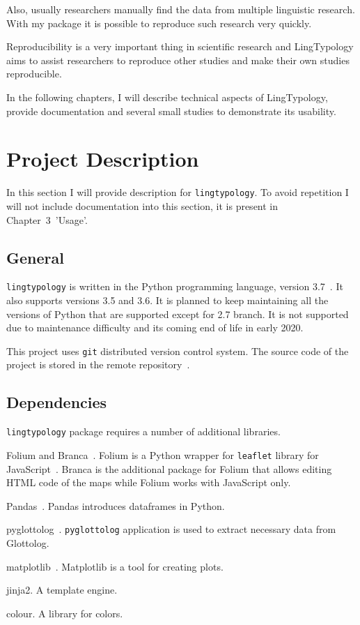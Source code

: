 \documentclass[a4paper,12pt]{article}
\begin{document}
Also, usually researchers manually find the data from multiple linguistic research. With my package it is possible to reproduce such research very quickly.

Reproducibility is a very important thing in scientific research and LingTypology aims to assist researchers to reproduce other studies and make their own studies reproducible.

In the following chapters, I will describe technical aspects of LingTypology, provide documentation and several small studies to demonstrate its usability.

\newpage


\section{Project Description}
In this section I will provide description for \texttt{lingtypology}. To avoid repetition I will not include documentation into this section, it is present in Chapter~3~'Usage'.

\subsection{General}
\texttt{lingtypology} is written in the Python programming language, version 3.7~\parencite{python}. It also supports versions 3.5 and 3.6. It is planned to keep maintaining all the versions of Python that are supported except for 2.7 branch. It is not supported due to maintenance difficulty and its coming end of life in early 2020.

This project uses \texttt{git} distributed version control system. The source code of the project is stored in the remote repository~\parencite{MichaelVoronov2019}.

\subsection{Dependencies}
\texttt{lingtypology} package requires a number of additional libraries.
\begin{itemize}
\begin{samepage}
  \item Folium and Branca~\parencite{folium}. Folium is a Python wrapper for \texttt{leaflet} library for JavaScript~\parencite{leaflet}. Branca is the additional package for Folium that allows editing HTML code of the maps while Folium works with JavaScript only. 
  \item Pandas~\parencite{pandas}. Pandas introduces dataframes in Python.
  \item pyglottolog~\parencite{Robert2Forkel2019}. \texttt{pyglottolog} application is used to extract necessary data from Glottolog.
  \item matplotlib~\parencite{matplotlib}. Matplotlib is a tool for creating plots.
  \item jinja2. A template engine.
  \item colour. A library for colors.
\end{samepage}
\end{itemize}
\end{document}
